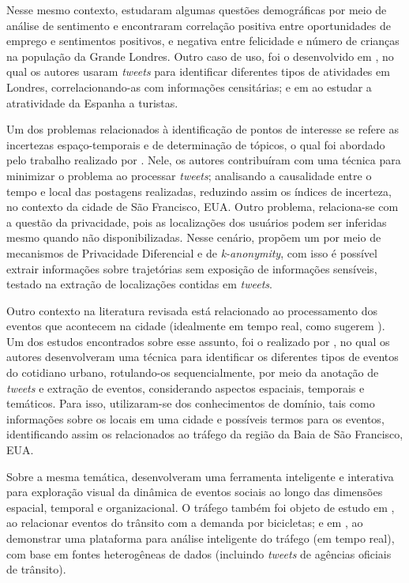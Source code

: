 \documentclass[
	12pt,				%
	oneside,			%
	a4paper,			%
	english,			%
	brazil				%
	]{abntex2ppgsi}
\begin{document}
{{{Nesse mesmo contexto, \cite{Guo2016} estudaram algumas questões demográficas por meio de análise de sentimento e encontraram correlação positiva entre oportunidades de emprego e sentimentos positivos, e negativa entre felicidade e número de crianças na população da Grande Londres. Outro caso de uso, foi o desenvolvido em \cite{Steiger2015Census}, no qual os autores usaram \textit{tweets} para identificar diferentes tipos de atividades em Londres, correlacionando-as com informações censitárias; e em \cite{Sobolevsky2015} ao estudar a atratividade da Espanha a turistas.

Um dos problemas relacionados à identificação de pontos de interesse se refere as incertezas espaço-temporais e de determinação de tópicos, o qual foi abordado pelo trabalho realizado por \cite{Bendler2014}. Nele, os autores contribuíram com uma técnica para minimizar o problema ao processar \textit{tweets}; analisando a causalidade entre o tempo e local das postagens realizadas, reduzindo assim os índices de incerteza, no contexto da cidade de São Francisco, EUA. Outro problema, relaciona-se com a questão da privacidade, pois as localizações dos usuários podem ser inferidas mesmo quando não disponibilizadas. Nesse cenário, \cite{Wang2017} propõem um  por meio de mecanismos de Privacidade Diferencial e de \textit{k-anonymity}, com isso é possível extrair informações sobre trajetórias sem exposição de informações sensíveis, testado na extração de localizações contidas em \textit{tweets}. 

Outro contexto na literatura revisada está relacionado ao processamento dos eventos que acontecem na cidade (idealmente em tempo real, como sugerem \cite{Soomro2016}). Um dos estudos encontrados sobre esse assunto, foi o realizado por \cite{Anantharam2015}, no qual os autores desenvolveram uma técnica para identificar os diferentes tipos de eventos do cotidiano urbano, rotulando-os sequencialmente, por meio da anotação de \textit{tweets} e extração de eventos, considerando aspectos espaciais, temporais e temáticos. Para isso, utilizaram-se dos conhecimentos de domínio, tais como informações sobre os locais em uma cidade e possíveis termos para os eventos, identificando assim os relacionados ao tráfego da região da Baia de São Francisco, EUA. 

Sobre a mesma temática, \cite{DiLorenzo2013} desenvolveram uma ferramenta inteligente e interativa para exploração visual da dinâmica de eventos sociais ao longo das dimensões espacial, temporal e organizacional. O tráfego também foi objeto de estudo em \cite{Chen2016}, ao relacionar eventos do trânsito com a demanda por bicicletas; e em \cite{Lecue2014}, ao demonstrar uma plataforma para análise inteligente do tráfego (em tempo real), com base em fontes heterogêneas de dados (incluindo \textit{tweets} de agências oficiais de trânsito).

}}}
\end{document}
